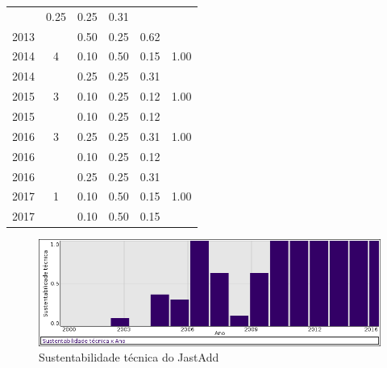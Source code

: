 \begin{table}[H]
\begin{tabular}{| l | c | c | c | c | c |}
          &
          0.25
          &
          0.25
          &
          0.31
          &
          \\
            2013
          &
          
          &
          0.50
          &
          0.25
          &
          0.62
          &
          \\
\hline
            2014
          &
          4
          &
          0.10
          &
          0.50
          &
          0.15
          &
            {\color{blue} 1.00}
          \\
            2014
          &
          
          &
          0.25
          &
          0.25
          &
          0.31
          &
          \\
\hline
            2015
          &
          3
          &
          0.10
          &
          0.25
          &
          0.12
          &
            {\color{blue} 1.00}
          \\
            2015
          &
          
          &
          0.10
          &
          0.25
          &
          0.12
          &
          \\
\hline
            2016
          &
          3
          &
          0.25
          &
          0.25
          &
          0.31
          &
            {\color{blue} 1.00}
          \\
            2016
          &
          
          &
          0.10
          &
          0.25
          &
          0.12
          &
          \\
            2016
          &
          
          &
          0.25
          &
          0.25
          &
          0.31
          &
          \\
\hline
            2017
          &
          1
          &
          0.10
          &
          0.50
          &
          0.15
          &
            {\color{blue} 1.00}
          \\
            2017
          &
          
          &
          0.10
          &
          0.50
          &
          0.15
          &
          \\
\hline
\end{tabular}
\end{table}

\begin{figure}[h]
  \center
  \includegraphics[scale=0.50]{imagens/softwares-charts/jastadd.png}
  \caption{Sustentabilidade técnica do JastAdd}
\end{figure}



